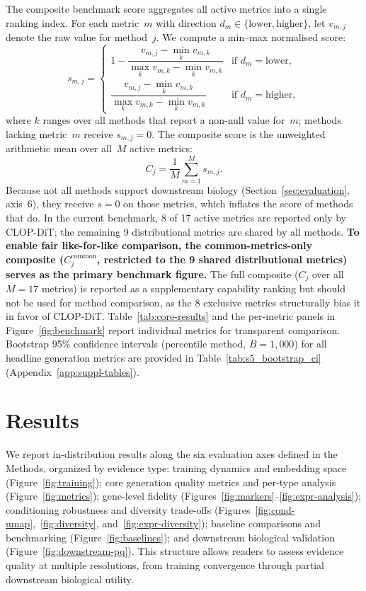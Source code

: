 \documentclass[fleqn,10pt,lineno]{wlpeerj}
\begin{document}
The composite benchmark score aggregates all active metrics into a single ranking index. For each metric~$m$ with direction $d_m \in \{\text{lower}, \text{higher}\}$, let $v_{m,j}$ denote the raw value for method~$j$. We compute a min--max normalised score:
\begin{equation}
  s_{m,j} =
  \begin{cases}
    1 - \dfrac{v_{m,j} - \min_k v_{m,k}}{\max_k v_{m,k} - \min_k v_{m,k}} & \text{if } d_m = \text{lower},\\[6pt]
    \dfrac{v_{m,j} - \min_k v_{m,k}}{\max_k v_{m,k} - \min_k v_{m,k}} & \text{if } d_m = \text{higher},
  \end{cases}
  \label{eq:norm}
\end{equation}
where $k$ ranges over all methods that report a non-null value for~$m$; methods lacking metric~$m$ receive $s_{m,j} = 0$. The composite score is the unweighted arithmetic mean over all~$M$ active metrics:
\begin{equation}
  C_j = \frac{1}{M}\sum_{m=1}^{M} s_{m,j}.
  \label{eq:composite}
\end{equation}
Because not all methods support downstream biology (Section~\ref{sec:evaluation}, axis~6), they receive $s = 0$ on those metrics, which inflates the score of methods that do. In the current benchmark, 8 of 17 active metrics are reported only by CLOP-DiT; the remaining 9 distributional metrics are shared by all methods. \textbf{To enable fair like-for-like comparison, the common-metrics-only composite ($C_j^{\text{common}}$, restricted to the 9 shared distributional metrics) serves as the primary benchmark figure.} The full composite ($C_j$ over all $M = 17$ metrics) is reported as a supplementary capability ranking but should not be used for method comparison, as the 8 exclusive metrics structurally bias it in favor of CLOP-DiT. Table~\ref{tab:core-results} and the per-metric panels in Figure~\ref{fig:benchmark} report individual metrics for transparent comparison. Bootstrap 95\% confidence intervals (percentile method, $B{=}1{,}000$) for all headline generation metrics are provided in Table~\ref{tab:s5_bootstrap_ci} (Appendix~\ref{app:suppl-tables}).

\section*{Results}\label{sec:results}

We report in-distribution results along the six evaluation axes defined in the Methods, organized by evidence type:
training dynamics and embedding space (Figure~\ref{fig:training});
core generation quality metrics and per-type analysis (Figure~\ref{fig:metrics});
gene-level fidelity (Figures~\ref{fig:markers}--\ref{fig:expr-analysis});
conditioning robustness and diversity trade-offs (Figures~\ref{fig:cond-umap},~\ref{fig:diversity}, and~\ref{fig:expr-diversity});
baseline comparisons and benchmarking (Figure~\ref{fig:baselines});
and downstream biological validation (Figure~\ref{fig:downstream-pq}).
This structure allows readers to assess evidence quality at multiple resolutions, from training convergence through partial downstream biological utility.
\end{document}
